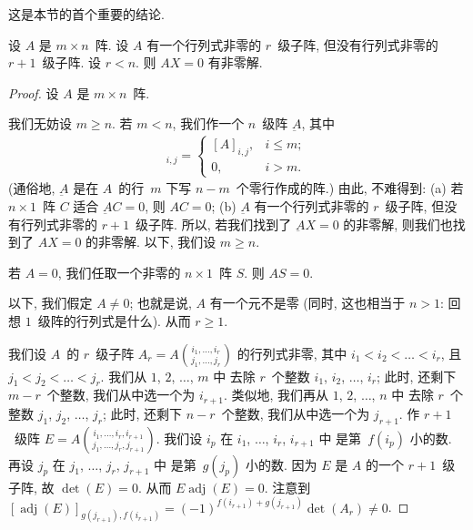 这是本节的首个重要的结论.

\begin{theorem}
    设 \(A\) 是 \(m \times n\)~阵.
    设 \(A\) 有一个行列式非零的 \(r\)~级子阵,
    但没有行列式非零的 \(r+1\)~级子阵.
    设 \(r < n\).
    则 \(AX = 0\) 有非零解.
\end{theorem}

\begin{proof}
    设 \(A\) 是 \(m \times n\)~阵.

    我们无妨设 \(m \geq n\).
    若 \(m < n\), 我们作一个 \(n\)~级阵 \(\underbar{A}\),
    其中
    \begin{align*}
        [\underbar{A}]_{i,j}
        = \begin{cases}
              [A]_{i,j}, & i \leq m; \\
              0,         & i > m.
          \end{cases}
    \end{align*}
    (通俗地, \(\underbar{A}\)
    是在 \(A\)~的行~\(m\) 下写 \(n-m\)~个零行作成的阵.)
    由此, 不难得到:
    (a)
    若 \(n \times 1\)~阵 \(C\) 适合 \(\underbar{A}C = 0\),
    则 \(AC = 0\);
    (b)
    \(\underbar{A}\) 有一个行列式非零的 \(r\)~级子阵,
    但没有行列式非零的 \(r+1\)~级子阵.
    所以, 若我们找到了 \(\underbar{A}X = 0\)
    的非零解,
    则我们也找到了 \(AX = 0\) 的非零解.
    以下, 我们设 \(m \geq n\).

    若 \(A = 0\),
    我们任取一个非零的 \(n \times 1\)~阵 \(S\).
    则 \(AS = 0\).

    以下, 我们假定 \(A \neq 0\);
    也就是说, \(A\) 有一个元不是零
    (同时, 这也相当于 \(n > 1\):
    回想 \(1\)~级阵的行列式是什么).
    从而 \(r \geq 1\).

    我们设 \(A\)~的 \(r\)~级子阵
    \(
    \displaystyle
    A_r = A\binom{i_1,\dots,i_r}{j_1,\dots,j_r}
    \)
    的行列式非零,
    其中 \(i_1 < i_2 < \dots < i_r\),
    且 \(j_1 < j_2 < \dots < j_r\).
    我们从 \(1\), \(2\), \(\dots\), \(m\) 中
    去除 \(r\)~个整数
    \(i_1\), \(i_2\), \(\dots\), \(i_r\);
    此时, 还剩下 \(m-r\)~个整数,
    我们从中选一个为 \(i_{r+1}\).
    类似地,
    我们再从 \(1\), \(2\), \(\dots\), \(n\) 中
    去除 \(r\)~个整数
    \(j_1\), \(j_2\), \(\dots\), \(j_r\);
    此时, 还剩下 \(n-r\)~个整数,
    我们从中选一个为 \(j_{r+1}\).
    作 \(r+1\)~级阵
    \(
    \displaystyle
    E =
    A\binom{i_1,\dots,i_r,i_{r+1}}
    {j_1,\dots,j_r,j_{r+1}}
    \).
    我们设 \(i_p\) 在
    \(i_1\), \(\dots\), \(i_r\), \(i_{r+1}\) 中%
    是第~\(f(i_p)\) 小的数.
    再设 \(j_p\) 在
    \(j_1\), \(\dots\), \(j_r\), \(j_{r+1}\) 中%
    是第~\(g(j_p)\) 小的数.
    因为 \(E\) 是 \(A\) 的一个 \(r+1\)~级子阵,
    故 \(\det {(E)} = 0\).
    从而
    \(E \operatorname{adj} {(E)} = 0\).
    注意到
    \([\operatorname{adj} {(E)}]_{g(j_{r+1}), f(i_{r+1})}
    = (-1)^{f(i_{r+1})+g(j_{r+1})} \det {(A_r)} \neq 0\).


\end{proof}
